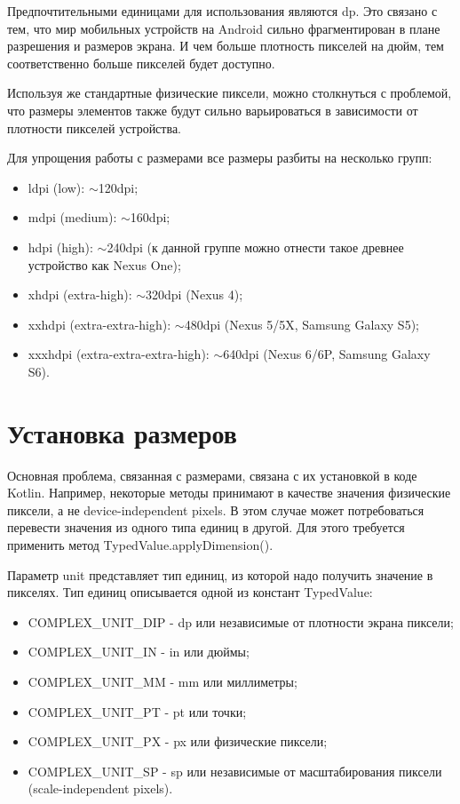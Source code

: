 Предпочтительными единицами для использования являются dp. Это связано
с тем, что мир мобильных устройств на Android сильно фрагментирован в
плане разрешения и размеров экрана. И чем больше плотность пикселей на
дюйм, тем соответственно больше пикселей будет доступно.\par
Используя же стандартные физические пиксели, можно столкнуться с
проблемой, что размеры элементов также будут сильно варьироваться в
зависимости от плотности пикселей устройства.\par
Для упрощения работы с размерами все размеры разбиты на несколько
групп:
\begin{itemize}
	\item ldpi (low): $\sim$120dpi;
	\item mdpi (medium): $\sim$160dpi;
	\item hdpi (high):
		$\sim$240dpi (к данной группе можно отнести такое древнее
		устройство как Nexus One);
	\item xhdpi (extra-high): $\sim$320dpi (Nexus 4);
	\item xxhdpi (extra-extra-high):
		$\sim$480dpi (Nexus 5/5X, Samsung Galaxy S5);
	\item xxxhdpi (extra-extra-extra-high):
		$\sim$640dpi (Nexus 6/6P, Samsung Galaxy S6).
\end{itemize}

\section{Установка размеров}
Основная проблема, связанная с размерами, связана с их установкой в коде
Kotlin. Например, некоторые методы принимают в качестве значения
физические пиксели, а не device-independent pixels. В этом случае может
потребоваться перевести значения из одного типа единиц в другой. Для этого
требуется применить метод TypedValue.applyDimension().\par
Параметр unit представляет тип единиц, из которой надо получить значение в
пикселях. Тип единиц описывается одной из констант TypedValue:
\begin{itemize}
	\item COMPLEX\_UNIT\_DIP - dp или независимые от плотности экрана пиксели;
	\item COMPLEX\_UNIT\_IN - in или дюймы;
	\item COMPLEX\_UNIT\_MM - mm или миллиметры;
	\item COMPLEX\_UNIT\_PT - pt или точки;
	\item COMPLEX\_UNIT\_PX - px или физические пиксели;
	\item COMPLEX\_UNIT\_SP - sp или независимые от масштабирования
		пиксели (scale-independent pixels).
\end{itemize}


